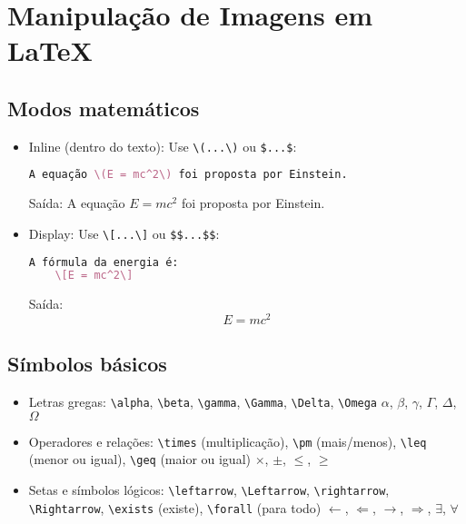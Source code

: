 \chapter{Manipulação de Imagens em LaTeX}



\section{Modos matemáticos}

\begin{itemize}
    \item Inline (dentro do texto): Use \verb|\(...\)| ou \verb|$...$|:
    \begin{lstlisting}[language=tex, caption=Equação inline]
    A equação \(E = mc^2\) foi proposta por Einstein.
    \end{lstlisting}
    Saída: A equação \(E = mc^2\) foi proposta por Einstein.
    \item Display: Use \verb|\[...\]| ou \verb|$$...$$|:
    \begin{lstlisting}[language=tex, caption=Equação display]
    A fórmula da energia é:
    \[E = mc^2\]
    \end{lstlisting}
    Saída: \[E = mc^2\]
\end{itemize}

\section{Símbolos básicos}

\begin{itemize}
    \item Letras gregas: \verb|\alpha|, \verb|\beta|, \verb|\gamma|, \verb|\Gamma|, \verb|\Delta|, \verb|\Omega|
    \(\alpha\), \(\beta\), \(\gamma\), \(\Gamma\), \(\Delta\), \(\Omega\)
    \item Operadores e relações: \verb|\times| (multiplicação), \verb|\pm| (mais/menos), \verb|\leq| (menor ou igual), \verb|\geq| (maior ou igual)
    \(\times\), \(\pm\), \(\leq\), \(\geq\)
    \item Setas e símbolos lógicos: \verb|\leftarrow|, \verb|\Leftarrow|, \verb|\rightarrow|, \verb|\Rightarrow|, \verb|\exists| (existe), \verb|\forall| (para todo)
    \(\leftarrow\), \(\Leftarrow\), \(\rightarrow\), \(\Rightarrow\), \(\exists\), \(\forall\)
\end{itemize}

